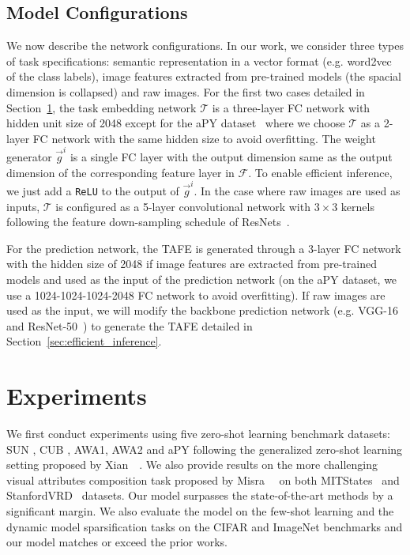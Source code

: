 \documentclass[10pt,twocolumn,letterpaper]{article}
\newcommand{\model}{TAFE-Net\xspace}
\begin{document}
\subsection{Model Configurations}
We now describe the network configurations. In
our work, we consider three types of task specifications: semantic representation
in a vector format (e.g. word2vec~\cite{mikolov2013efficient} of the class labels),
image features extracted from pre-trained models (the spacial dimension is collapsed) and raw images. For the first two cases detailed in Section~\ref{sec:exp},
the task embedding network $\mathcal{T}$ is a three-layer FC network with hidden unit size of 2048 except 
for the aPY dataset~\cite{farhadi2009describing} where we choose  $\mathcal{T}$ as a 2-layer FC network with the same hidden size to avoid overfitting. The weight generator $
\Vec{g}^i$ is a single FC layer with the output dimension same as the output dimension
of the corresponding feature layer in $\mathcal{F}$. To enable efficient inference,
we just add a \texttt{ReLU} to the output of $\Vec{g}^i$. In the case where raw
images are used as inputs, $\mathcal{T}$ is configured as a 5-layer convolutional
network with $3\times3$ kernels following the feature down-sampling schedule of
ResNets~\cite{he2016deep}. 

For the prediction network, the TAFE is generated through a 3-layer FC
network with the hidden size of 2048 if image features are extracted from pre-trained
models and used as the input of the prediction network (on the aPY dataset, 
we use a 1024-1024-1024-2048 FC network to avoid overfitting). If raw images 
are used as the input, we will modify the backbone prediction network (e.g. VGG-16~\cite{simonyan2014very} and ResNet-50~\cite{he2016deep}) to generate the TAFE detailed in Section~\ref{sec:efficient_inference}.

\newcommand{\controlmodel}{controller\xspace}\newcommand{\controlmodelplural}{controllers\xspace}\section{Experiments}\label{sec:exp}%
We first conduct experiments using five zero-shot learning benchmark datasets: SUN%
, CUB%
, AWA1, %
AWA2 %
and aPY %
following the generalized zero-shot learning setting proposed by Xian~\etal~\cite{xian2018zero}. We also provide results on the more 
challenging visual attributes composition task proposed by Misra~\etal~\cite{misra2017red} on both
MITStates~\cite{StatesAndTransformations} and StanfordVRD~\cite{lu2016visual} datasets. Our model surpasses the 
state-of-the-art methods by a significant margin. We also evaluate the model on the few-shot learning and the 
dynamic model sparsification tasks on the CIFAR and ImageNet 
benchmarks and our model matches or exceed the prior works. 
\end{document}

